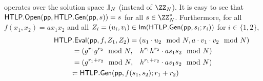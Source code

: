 \noindent {} operates over the solution space $\mathbb{J}_N$ (instead of $\ZZ_N$).
It is easy to see that $\mathsf{HTLP}.\mathsf{Open}(\mathsf{pp},\allowbreak \mathsf{HTLP}.{\sf Gen}(\mathsf{pp}, s)) = s$ for all $s \in \ZZ_N^*$. Furthermore, for all $f(x_1, x_2) = a x_1 x_2$ and all $Z_i = (u_i, v_i) \in {\sf Im}(\mathsf{HTLP}.{\sf Gen}(\mathsf{pp},\allowbreak s_i; r_i))$ for $i \in \{1,2\}$,
\begin{align*}
    \htlp&\rlap{$.{\sf Eval}(\pp, f, Z_1, Z_2) = (u_1 \cdot u_2 \mod{N}, a \cdot v_1 \cdot v_2 \mod{N})$} &&\\
    &= (g^{r_1} g^{r_2} \mod{N}, &&h^{r_1} h^{r_2} \cdot a s_1 s_2 \mod{N})\\
    &= (g^{r_1 + r_2} \mod{N},   &&h^{r_1 + r_2} \cdot a s_1 s_2 \mod{N})\\
    &\rlap{$= \htlp.{\sf Gen}(\pp, f(s_1, s_2); r_1 + r_2)$}. &&
\end{align*}



